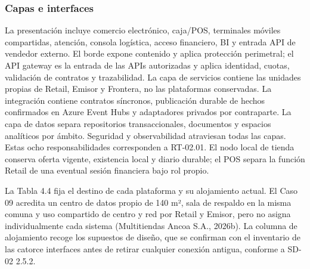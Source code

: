 \documentclass[11pt]{article}
\begin{document}
\subsubsection{Capas e interfaces}

La presentación incluye comercio electrónico, caja/POS, terminales móviles compartidas, atención, consola logística, acceso financiero, BI y entrada API de vendedor externo. El borde expone contenido y aplica protección perimetral; el API gateway es la entrada de las APIs autorizadas y aplica identidad, cuotas, validación de contratos y trazabilidad. La capa de servicios contiene las unidades propias de Retail, Emisor y Frontera, no las plataformas conservadas. La integración contiene contratos síncronos, publicación durable de hechos confirmados en Azure Event Hubs y adaptadores privados por contraparte. La capa de datos separa repositorios transaccionales, documentos y espacios analíticos por ámbito. Seguridad y observabilidad atraviesan todas las capas. Estas ocho responsabilidades corresponden a RT-02.01. El nodo local de tienda conserva oferta vigente, existencia local y diario durable; el POS separa la función Retail de una eventual sesión financiera bajo rol propio.

La Tabla 4.4 fija el destino de cada plataforma y su alojamiento actual. El Caso 09 acredita un centro de datos propio de 140 m², sala de respaldo en la misma comuna y uso compartido de centro y red por Retail y Emisor, pero no asigna individualmente cada sistema (Multitiendas Ancoa S.A., 2026b). La columna de alojamiento recoge los supuestos de diseño, que se confirman con el inventario de las catorce interfaces antes de retirar cualquier conexión antigua, conforme a SD-02 2.5.2.

\par\vspace{0pt plus 10\baselineskip}\vspace{0pt plus -10\baselineskip}
\end{document}

